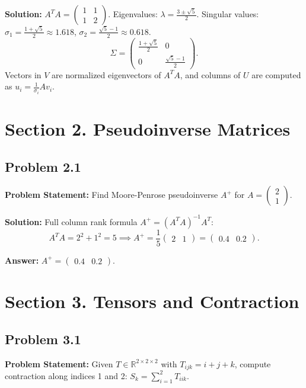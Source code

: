 \documentclass[11pt, a4paper]{article}
\begin{document}
\textbf{Solution:}
$A^T A = \begin{pmatrix} 1 & 1 \\ 1 & 2 \end{pmatrix}$. Eigenvalues: $\lambda = \frac{3 \pm \sqrt{5}}{2}$.
Singular values: $\sigma_1 = \frac{1+\sqrt{5}}{2} \approx 1.618$, $\sigma_2 = \frac{\sqrt{5}-1}{2} \approx 0.618$.
$$ \Sigma = \begin{pmatrix} \frac{1+\sqrt{5}}{2} & 0 \\ 0 & \frac{\sqrt{5}-1}{2} \end{pmatrix}. $$
Vectors in $V$ are normalized eigenvectors of $A^T A$, and columns of $U$ are computed as $u_i = \frac{1}{\sigma_i} A v_i$.

\newpage

\section{Section 2. Pseudoinverse Matrices}

\subsection*{Problem 2.1}
\textbf{Problem Statement:} Find Moore-Penrose pseudoinverse $A^+$ for $A = \begin{pmatrix} 2 \\ 1 \end{pmatrix}$.

\textbf{Solution:} Full column rank formula $A^+ = (A^T A)^{-1} A^T$:
$$ A^T A = 2^2 + 1^2 = 5 \implies A^+ = \frac{1}{5} \begin{pmatrix} 2 & 1 \end{pmatrix} = \begin{pmatrix} 0.4 & 0.2 \end{pmatrix}. $$

\textbf{Answer:} $A^+ = \begin{pmatrix} 0.4 & 0.2 \end{pmatrix}$.

\newpage

\section{Section 3. Tensors and Contraction}

\subsection*{Problem 3.1}
\textbf{Problem Statement:} Given $T \in \mathbb{R}^{2 \times 2 \times 2}$ with $T_{ijk} = i + j + k$, compute contraction along indices 1 and 2: $S_k = \sum_{i=1}^2 T_{iik}$.
\end{document}
